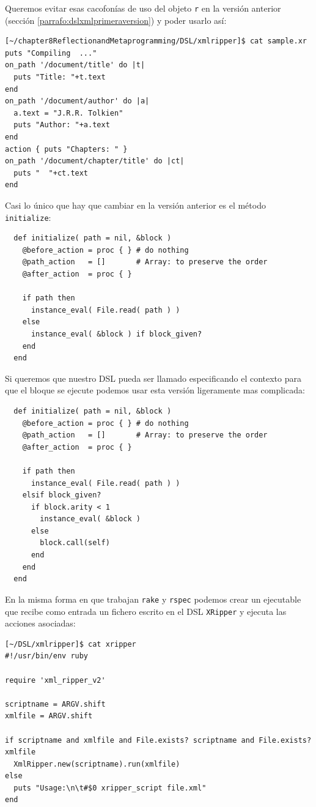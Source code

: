 Queremos  evitar esas cacofonías de uso del objeto \verb|r|
en la versión anterior (sección \ref{parrafo:dslxmlprimeraversion}) y poder usarlo así:

\begin{verbatim}
[~/chapter8ReflectionandMetaprogramming/DSL/xmlripper]$ cat sample.xr 
puts "Compiling  ..."
on_path '/document/title' do |t| 
  puts "Title: "+t.text 
end
on_path '/document/author' do |a| 
  a.text = "J.R.R. Tolkien"
  puts "Author: "+a.text 
end
action { puts "Chapters: " }
on_path '/document/chapter/title' do |ct| 
  puts "  "+ct.text 
end
\end{verbatim}


Casi lo único que hay que cambiar en la versión anterior es el método
\verb|initialize|:
\begin{verbatim}
  def initialize( path = nil, &block )
    @before_action = proc { } # do nothing
    @path_action   = []       # Array: to preserve the order
    @after_action  = proc { }

    if path then
      instance_eval( File.read( path ) )
    else
      instance_eval( &block ) if block_given?
    end
  end
\end{verbatim}

Si queremos que nuestro DSL pueda ser llamado especificando el contexto para que el bloque se ejecute
podemos usar esta versión ligeramente mas complicada:

\begin{verbatim}
  def initialize( path = nil, &block )
    @before_action = proc { } # do nothing
    @path_action   = []       # Array: to preserve the order
    @after_action  = proc { }

    if path then
      instance_eval( File.read( path ) )
    elsif block_given?
      if block.arity < 1
        instance_eval( &block ) 
      else
        block.call(self)
      end
    end
  end
\end{verbatim}


En la misma forma en que trabajan \verb|rake| y \verb|rspec| podemos crear un ejecutable
que recibe como entrada un fichero escrito en el DSL \verb|XRipper| y ejecuta las acciones
asociadas:

\begin{verbatim}
[~/DSL/xmlripper]$ cat xripper 
#!/usr/bin/env ruby

require 'xml_ripper_v2'

scriptname = ARGV.shift
xmlfile = ARGV.shift

if scriptname and xmlfile and File.exists? scriptname and File.exists? xmlfile
  XmlRipper.new(scriptname).run(xmlfile)
else
  puts "Usage:\n\t#$0 xripper_script file.xml"
end
\end{verbatim}

